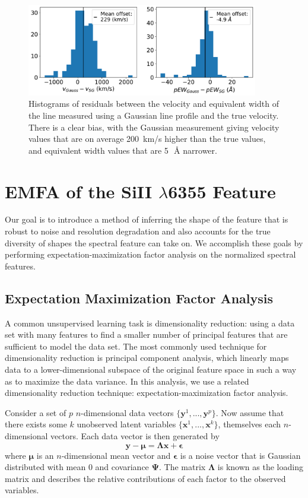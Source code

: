 \begin{figure}[htbp]
    \centering
    \includegraphics[width=0.9\textwidth]{figures/si_feat_pca/gauss_bias.pdf}
    \caption{Histograms of residuals between the velocity and equivalent width of the \siliconii{} line measured using a Gaussian line profile and the true velocity. There is a clear bias, with the Gaussian measurement giving velocity values that are on average 200~km/s higher than the true values, and equivalent width values that are 5~\,\AA{} narrower.}
    \label{gauss_bias}
\end{figure}


\section{EMFA of the SiII \texorpdfstring{$\lambda$}{}6355 Feature}
\label{method}
Our goal is to introduce a method of inferring the shape of the \siliconii{} feature that is robust to noise and resolution degradation and also accounts for the true diversity of shapes the spectral feature can take on. We accomplish these goals by performing expectation-maximization factor analysis on the normalized spectral features.

\subsection{Expectation Maximization Factor Analysis}
A common unsupervised learning task is dimensionality reduction: using a data set with many features to find a smaller number of principal features that are sufficient to model the data set. The most commonly used technique for dimensionality reduction is principal component analysis, which linearly maps data to a lower-dimensional subspace of the original feature space in such a way as to maximize the data variance. In this analysis, we use a related dimensionality reduction technique: expectation-maximization factor analysis.

Consider a set of $p$ $n$-dimensional data vectors $\{\bm{y}^1, ..., \bm{y}^p\}$. Now assume that there exists some $k$ unobserved latent variables $\{\bm{x}^1, ..., \bm{x}^k\}$, themselves each $n$-dimensional vectors. Each data vector is then generated by
\begin{equation}
\bm{y} - \bm{\mu} = \bm{\Lambda}\bm{x}+\bm{\epsilon}
\end{equation}
where $\bm{\mu}$ is an $n$-dimensional mean vector and $\bm{\epsilon}$ is a noise vector that is Gaussian distributed with mean 0 and covariance $\bm{\Psi}$. The matrix $\bm{\Lambda}$ is known as the loading matrix and describes the relative contributions of each factor to the observed variables.

